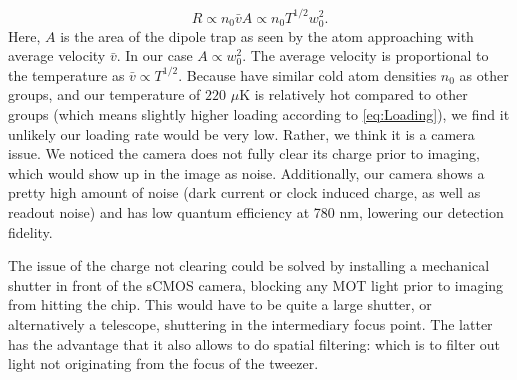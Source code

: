 \begin{equation}\label{eq:Loading}
    R \propto n_0 \bar{v} A\propto n_0 T^{1/2} w_0^2.
\end{equation}
Here, $A$ is the area of the dipole trap as seen by the atom approaching with average velocity $\bar{v}$. 
In our case $A \propto w_0^2$.
The average velocity is proportional to the temperature as $\bar{v}\propto T^{1/2}$.
Because have similar cold atom densities $n_0$ as other groups, and our temperature of $220$ $\mu$K is relatively hot compared to other groups (which means slightly higher loading according to \cref{eq:Loading}), we find it unlikely our loading rate would be very low. 
Rather, we think it is a camera issue. 
We noticed the camera does not fully clear its charge prior to imaging, which would show up in the image as noise. 
Additionally, our camera shows a pretty high amount of noise (dark current or clock induced charge, as well as readout noise) and has low quantum efficiency at 780 nm, lowering our detection fidelity. 

The issue of the charge not clearing could be solved by installing a mechanical shutter in front of the sCMOS camera, blocking any MOT light prior to imaging from hitting the chip. 
This would have to be quite a large shutter, or alternatively a telescope, shuttering in the intermediary focus point. 
The latter has the advantage that it also allows to do spatial filtering: which is to filter out light not originating from the focus of the tweezer. 
 

